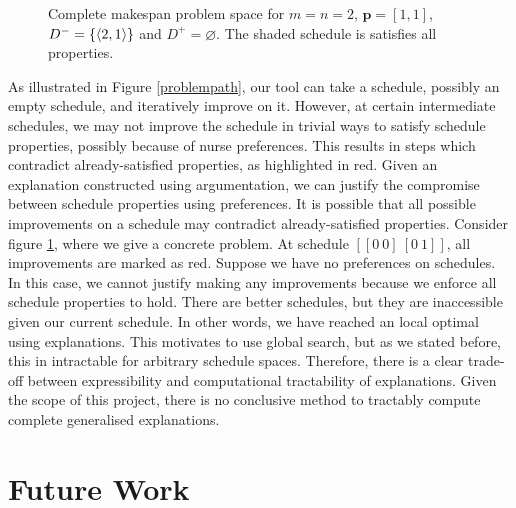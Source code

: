 \begin{figure}[H]
	\label{problemspace}
	
	\caption{Complete makespan problem space for $m=n=2$, $\mathbf{p}=[1,1]$, $D^-=\{\langle{2},{1}\rangle\}$ and $D^+=\varnothing$. The shaded schedule is satisfies all properties.}
\end{figure}

As illustrated in Figure \ref{problempath}, our tool can take a schedule, possibly an empty schedule, and iteratively improve on it. However, at certain intermediate schedules, we may not improve the schedule in trivial ways to satisfy schedule properties, possibly because of nurse preferences. This results in steps which contradict already-satisfied properties, as highlighted in red. Given an explanation constructed using argumentation, we can justify the compromise between schedule properties using preferences.
\linespace
It is possible that all possible improvements on a schedule may contradict already-satisfied properties. Consider figure \ref{problemspace}, where we give a concrete problem. At schedule $[[0\ 0]\ [0\ 1]]$, all improvements are marked as red. Suppose we have no preferences on schedules. In this case, we cannot justify making any improvements because we enforce all schedule properties to hold. There are better schedules, but they are inaccessible given our current schedule. In other words, we have reached an local optimal using explanations. This motivates to use global search, but as we stated before, this in intractable for arbitrary schedule spaces. Therefore, there is a clear trade-off between expressibility and computational tractability of explanations. Given the scope of this project, there is no conclusive method to tractably compute complete generalised explanations.

\section{Future Work}

